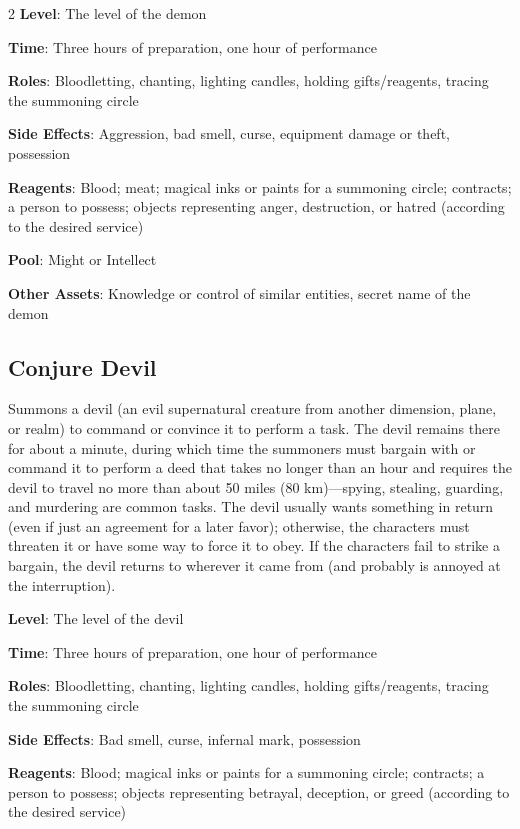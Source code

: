 \begin{multicols}{2}
\textbf{Level}: The level of the demon 

\textbf{Time}: Three hours of preparation, one hour of performance 

\textbf{Roles}: Bloodletting, chanting, lighting candles, holding gifts/reagents, tracing the summoning circle 

\textbf{Side Effects}: Aggression, bad smell, curse, equipment damage or theft, possession 

\textbf{Reagents}: Blood; meat; magical inks or paints for a summoning circle; contracts; a person to possess; objects representing anger, destruction, or hatred (according to the desired service) 

\textbf{Pool}: Might or Intellect 

\textbf{Other Assets}: Knowledge or control of similar entities, secret name of the demon

\subsection{Conjure Devil}

Summons a devil (an evil supernatural creature from another dimension, plane, or realm) to command or convince it to perform a task. The devil remains there for about a minute, during which time the summoners must bargain with or command it to perform a deed that takes no longer than an hour and requires the devil to travel no more than about 50 miles (80 km)—spying, stealing, guarding, and murdering are common tasks. The devil usually wants something in return (even if just an agreement for a later favor); otherwise, the characters must threaten it or have some way to force it to obey. If the characters fail to strike a bargain, the devil returns to wherever it came from (and probably is annoyed at the interruption).

\textbf{Level}: The level of the devil 

\textbf{Time}: Three hours of preparation, one hour of performance 

\textbf{Roles}: Bloodletting, chanting, lighting candles, holding gifts/reagents, tracing the summoning circle 

\textbf{Side Effects}: Bad smell, curse, infernal mark, possession

\textbf{Reagents}: Blood; magical inks or paints for a summoning circle; contracts; a person to possess; objects representing betrayal, deception, or greed (according to the desired service) 


\end{multicols}
